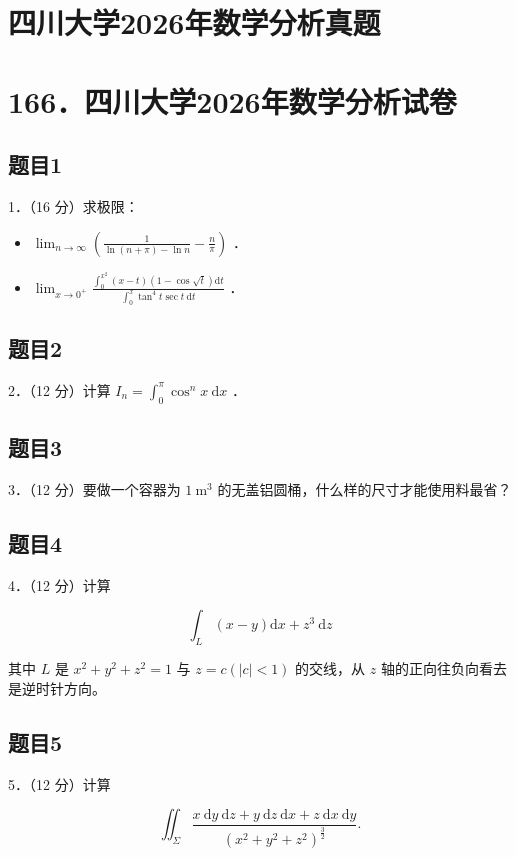 \documentclass{article}
\begin{document}
\section*{四川大学2026年数学分析真题}
\section*{166．四川大学2026年数学分析试卷}

\subsection{题目1}
1．（16 分）求极限：

\begin{itemize}
  \item[（1）] \(\lim _{n \rightarrow \infty}\left(\frac{1}{\ln (n+\pi)-\ln n}-\frac{n}{\pi}\right)\) ．
  \item[（2）] \(\lim _{x \rightarrow 0^{+}} \frac{\int_{0}^{x^{2}}(x-t)(1-\cos \sqrt{t}) \mathrm{d} t}{\int_{0}^{x} \tan ^{4} t \sec t \mathrm{~d} t}\) ．
\end{itemize}

\subsection{题目2}
2．（12 分）计算 \(I_{n}=\int_{0}^{\pi} \cos ^{n} x \mathrm{~d} x\) ．

\subsection{题目3}
3．（12 分）要做一个容器为 \(1 \mathrm{~m}^{3}\) 的无盖铝圆桶，什么样的尺寸才能使用料最省？

\subsection{题目4}
4．（12 分）计算

\[
\int_{L}(x-y) \mathrm{d} x+z^{3} \mathrm{~d} z
\]

其中 \(L\) 是 \(x^{2}+y^{2}+z^{2}=1\) 与 \(z=c(|c|<1)\) 的交线，从 \(z\) 轴的正向往负向看去是逆时针方向。

\subsection{题目5}
5．（12 分）计算

\[
\iint_{\Sigma} \frac{x \mathrm{~d} y \mathrm{~d} z+y \mathrm{~d} z \mathrm{~d} x+z \mathrm{~d} x \mathrm{~d} y}{\left(x^{2}+y^{2}+z^{2}\right)^{\frac{3}{2}}} .
\]
\end{document}
